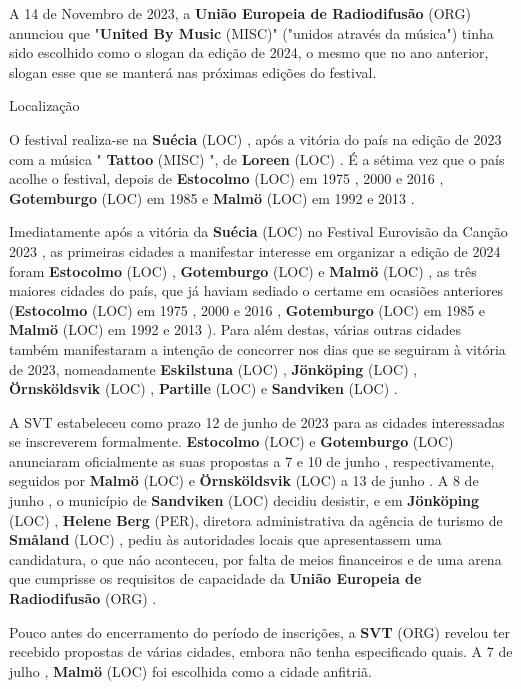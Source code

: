 \documentclass[12pt,a4paper]{article}
\begin{document}
A 14 de Novembro de 2023, a \textbf{União Europeia de Radiodifusão} (ORG) anunciou que "\textbf{United By Music} (MISC)" ("unidos através da música") tinha sido escolhido como o slogan da edição de 2024, o mesmo que no ano anterior, slogan esse que se manterá nas próximas edições do festival.



Localização

O festival realiza-se na \textbf{Suécia} (LOC) , após a vitória do país na edição de 2023 com a música " \textbf{Tattoo} (MISC) ", de \textbf{Loreen} (LOC) . É a sétima vez que o país acolhe o festival, depois de \textbf{Estocolmo} (LOC) em 1975 , 2000 e 2016 , \textbf{Gotemburgo} (LOC) em 1985 e \textbf{Malmö} (LOC) em 1992 e 2013 .

Imediatamente após a vitória da \textbf{Suécia} (LOC) no Festival Eurovisão da Canção 2023 , as primeiras cidades a manifestar interesse em organizar a edição de 2024 foram \textbf{Estocolmo} (LOC) , \textbf{Gotemburgo} (LOC) e \textbf{Malmö} (LOC) , as três maiores cidades do país, que já haviam sediado o certame em ocasiões anteriores (\textbf{Estocolmo} (LOC) em 1975 , 2000 e 2016 , \textbf{Gotemburgo} (LOC) em 1985 e \textbf{Malmö} (LOC) em 1992 e 2013 ). Para além destas, várias outras cidades também manifestaram a intenção de concorrer nos dias que se seguiram à vitória de 2023, nomeadamente \textbf{Eskilstuna} (LOC) , \textbf{Jönköping} (LOC) , \textbf{Örnsköldsvik} (LOC) , \textbf{Partille} (LOC) e \textbf{Sandviken} (LOC) .

A SVT estabeleceu como prazo 12 de junho de 2023 para as cidades interessadas se inscreverem formalmente. \textbf{Estocolmo} (LOC) e \textbf{Gotemburgo} (LOC) anunciaram oficialmente as suas propostas a 7 e 10 de junho , respectivamente, seguidos por \textbf{Malmö} (LOC) e \textbf{Örnsköldsvik} (LOC) a 13 de junho . A 8 de junho , o município de \textbf{Sandviken} (LOC) decidiu desistir, e em \textbf{Jönköping} (LOC) , \textbf{Helene Berg} (PER), diretora administrativa da agência de turismo de \textbf{Småland} (LOC) , pediu às autoridades locais que apresentassem uma candidatura, o que náo aconteceu, por falta de meios financeiros e de uma arena que cumprisse os requisitos de capacidade da \textbf{União Europeia de Radiodifusão} (ORG) .

Pouco antes do encerramento do período de inscrições, a \textbf{SVT} (ORG) revelou ter recebido propostas de várias cidades, embora não tenha especificado quais. A 7 de julho , \textbf{Malmö} (LOC) foi escolhida como a cidade anfitriã.
\end{document}
